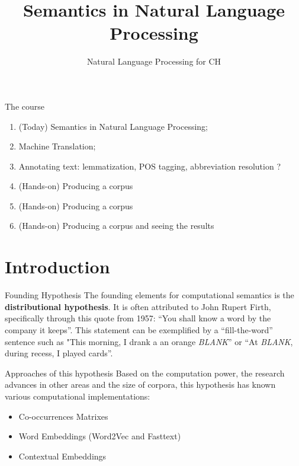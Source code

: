 \documentclass[aspectratio=169]{beamer}
\title[NLP 4 CH]{Semantics in Natural Language Processing}
\date[2024] %
{Natural Language Processing for CH}
\begin{document}
\frame{\titlepage}

\begin{frame}{The course}
    \begin{enumerate}
        \item (Today) Semantics in Natural Language Processing;
        \item Machine Translation;
        \item Annotating text: lemmatization, POS tagging, abbreviation resolution ?
        \item (Hands-on) Producing a corpus
        \item (Hands-on) Producing a corpus
        \item (Hands-on) Producing a corpus and seeing the results
    \end{enumerate}
\end{frame}

\section{Introduction}

\begin{frame}{Founding Hypothesis}
    The founding elements for computational semantics is the \textbf{distributional hypothesis}. It is often attributed to John Rupert Firth, specifically through this quote from 1957: ``You shall know a word by the company it keeps''.
    \vspace{1em}
    This statement can be exemplified by a ``fill-the-word'' sentence such as "This morning, I drank a an orange \textit{BLANK}'' or ``At \textit{BLANK}, during recess, I played cards''.
\end{frame}

\begin{frame}{Approaches of this hypothesis}
    Based on the computation power, the research advances in other areas and the size of corpora, this hypothesis has known various computational implementations:
    \begin{itemize}
        \item Co-occurrences Matrixes
        \item Word Embeddings (Word2Vec and Fasttext)
        \item Contextual Embeddings
    \end{itemize}
\end{frame}
\end{document}

